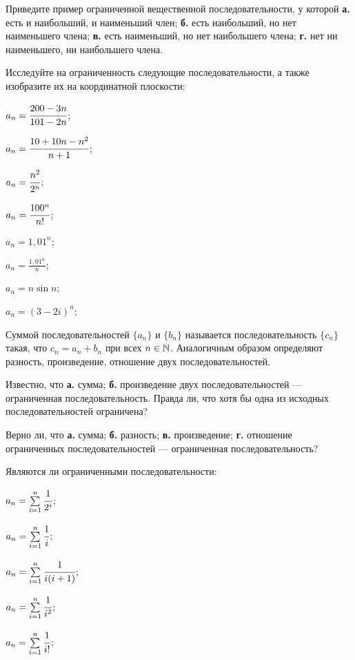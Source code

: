 \documentclass[a4paper, 12pt, num=24]{listok}
\begin{document}
\begin{problem}
	Приведите пример ограниченной вещественной последовательности, у которой \textbf{а.} есть и наибольший, и наименьший член;
	\textbf{б.} есть наибольший, но нет наименьшего члена;
	\textbf{в.} есть наименьший, но нет наибольшего члена;
	\textbf{г.} нет ни наименьшего, ни наибольшего члена.
\end{problem}
\begin{problem}
	Исследуйте на ограниченность следующие последовательности, а также изобразите их на координатной плоскости:
	\begin{multienum}{3}
		\item $a_n = \cfrac{200 - 3n}{101 - 2n}$;
		\item $a_n = \cfrac{10 + 10n - n^2}{n + 1}$;
		\item $a_n = \cfrac{n^2}{2^n}$;
		\item $a_n = \cfrac{100^n}{n!}$;
		\item $a_n = 1,{}01^n$;
		\item $a_n = \frac{1,{}01^n}n$;
		\item $a_n = n \sin{n}$;
		\item $a_n = {(3 - 2i)}^n$;
	\end{multienum}
\end{problem}
\begin{definition}
	Суммой последовательностей $\{a_n\}$ и $\{b_n\}$ называется последовательность $\{c_n\}$ такая,
	что $c_n = a_n + b_n$ при всех $n \in \mathbb{N}$.
	Аналогичным образом определяют разность, произведение, отношение двух последовательностей.
\end{definition}
\begin{problem}
	Известно, что \textbf{а.} сумма; \textbf{б.} произведение двух последовательностей --- ограниченная последовательность.
	Правда ли, что хотя бы одна из исходных последовательностей ограничена?
\end{problem}
\begin{problem}
	Верно ли, что \textbf{а.} сумма; \textbf{б.} разность; \textbf{в.} произведение; \textbf{г.} отношение
	ограниченных последовательностей --- ограниченная последовательность?
\end{problem}
\begin{problem}
	Являются ли ограниченными последовательности:
	\begin{multienum}{3}
		\item $a_n = \sum\limits_{i = 1}^n \cfrac1{2^i}$;
		\item $a_n = \sum\limits_{i = 1}^n \cfrac1i$;
		\item $a_n = \sum\limits_{i = 1}^n \cfrac1{i(i + 1)}$;
		\item $a_n = \sum\limits_{i = 1}^n \cfrac1{i^2}$;
		\item $a_n = \sum\limits_{i = 1}^n \cfrac1{i!}$;
	\end{multienum}
\end{problem}
\end{document}
